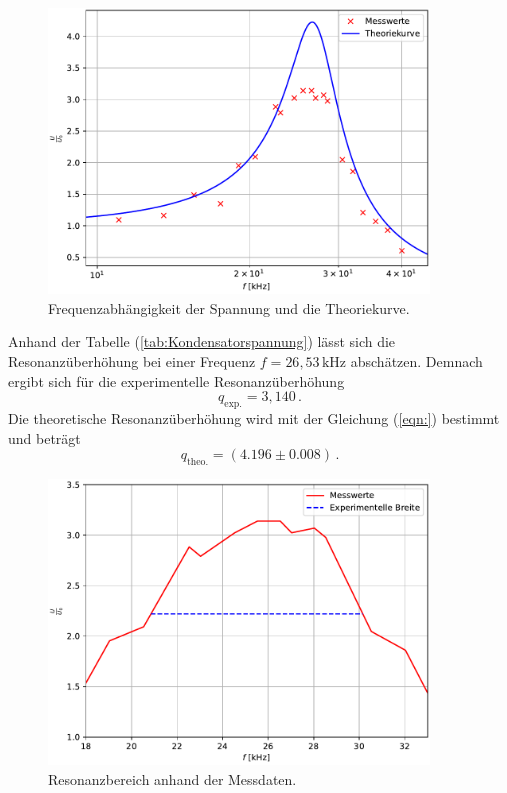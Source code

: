 \begin{figure}[H]
  \centering
  \includegraphics[width=0.90\textwidth]{plot_b.pdf}
  \caption{Frequenzabhängigkeit der Spannung und die Theoriekurve.}
  \label{fig:Frequenzabhängigkeit}
\end{figure}
Anhand der Tabelle (\ref{tab:Kondensatorspannung}) lässt sich die Resonanzüberhöhung bei einer Frequenz $f = 26,53\,\unit{\kilo\hertz}$ abschätzen. Demnach ergibt sich für die 
experimentelle Resonanzüberhöhung
$$q_{\text{exp.}}= 3,140\,.$$
Die theoretische Resonanzüberhöhung wird mit der Gleichung (\ref{eqn:}) bestimmt und beträgt
$$q_{\text{theo.}}=\left( 4.196\pm0.008 \right)\,.$$

\begin{figure}[H]
  \centering
  \includegraphics[width=0.90\textwidth]{plot_c.pdf}
  \caption{Resonanzbereich anhand der Messdaten.}
  \label{fig:Resonanzbereich}
\end{figure}

